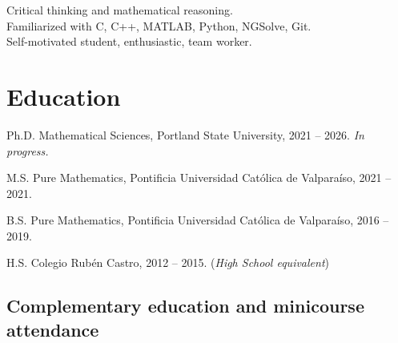 \documentclass[12pt,letterpaper]{report}
\begin{document}
    Critical thinking and mathematical reasoning.\\
    Familiarized with C, C++, MATLAB, Python, NGSolve, Git.\\
    Self-motivated student, enthusiastic, team worker.


    
    \section*{Education}

    \begin{tablist}
        \item[Ph.D.] \tab Mathematical Sciences, Portland State University, 2021 -- 2026. \emph{In progress.}
        \item[M.S.]  \tab Pure Mathematics, Pontificia Universidad Cat\'olica de Valpara\'iso, 2021 -- 2021.
        \item[B.S.]  \tab Pure Mathematics, Pontificia Universidad Cat\'olica de Valpara\'iso, 2016 -- 2019.
        \item[H.S.] \tab Colegio Rub\'en Castro, 2012 -- 2015. (\emph{High School equivalent})
    \end{tablist}

    \subsection*{Complementary education and minicourse attendance}
\end{document}
